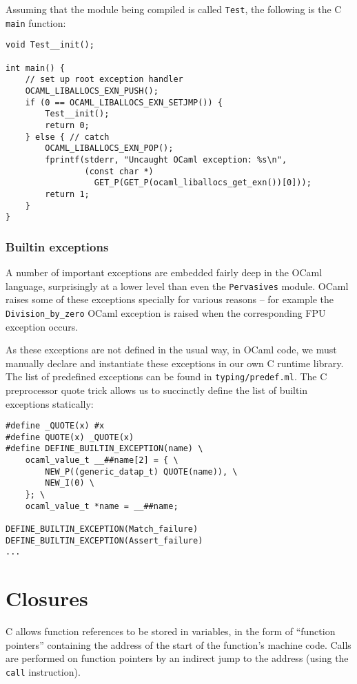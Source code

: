 \documentclass[12pt,a4paper,twoside,openright]{report}
\begin{document}
Assuming that the module being compiled is called \lstinline!Test!, the
following is the C \lstinline!main! function:

\begin{lstlisting}
void Test__init();

int main() {
    // set up root exception handler
    OCAML_LIBALLOCS_EXN_PUSH();
    if (0 == OCAML_LIBALLOCS_EXN_SETJMP()) {
        Test__init();
        return 0;
    } else { // catch
        OCAML_LIBALLOCS_EXN_POP();
        fprintf(stderr, "Uncaught OCaml exception: %s\n",
                (const char *)
                  GET_P(GET_P(ocaml_liballocs_get_exn())[0]));
        return 1;
    }
}
\end{lstlisting}

\subsubsection{Builtin exceptions}\label{builtin-exceptions}

A number of important exceptions are embedded fairly deep in the OCaml
language, surprisingly at a lower level than even the \lstinline!Pervasives!
module. OCaml raises some of these exceptions specially for various reasons --
for example the \lstinline!Division_by_zero! OCaml exception is raised when the
corresponding FPU exception occurs.

As these exceptions are not defined in the usual way, in OCaml code, we must
manually declare and instantiate these exceptions in our own C runtime library.
The list of predefined exceptions can be found in \lstinline!typing/predef.ml!.
The C preprocessor quote trick allows us to succinctly define the list of
builtin exceptions statically:

\begin{lstlisting}
#define _QUOTE(x) #x
#define QUOTE(x) _QUOTE(x)
#define DEFINE_BUILTIN_EXCEPTION(name) \
    ocaml_value_t __##name[2] = { \
        NEW_P((generic_datap_t) QUOTE(name)), \
        NEW_I(0) \
    }; \
    ocaml_value_t *name = __##name;

DEFINE_BUILTIN_EXCEPTION(Match_failure)
DEFINE_BUILTIN_EXCEPTION(Assert_failure)
...
\end{lstlisting}

\section{Closures}\label{closures}

C allows function references to be stored in variables, in the form of
``function pointers'' containing the address of the start of the function's
machine code. Calls are performed on function pointers by an indirect jump to
the address (using the \lstinline!call! instruction).
\end{document}
